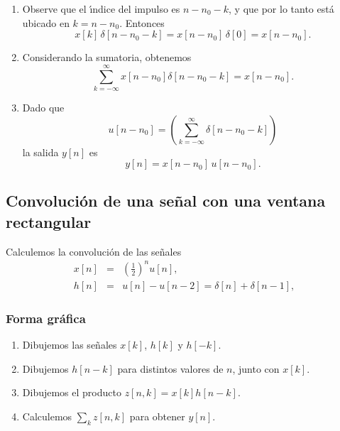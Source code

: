 \begin{enumerate}
\item Observe que el \'{\i}ndice del impulso es $n - n_{0} - k$, y que
  por lo tanto est\'{a} ubicado en $k = n - n_{0}$. Entonces
  \begin{equation}
    x[k] \, \delta \left[ n-n_{0}-k\right] = x[n-n_{0}] \, \delta \left[0\right] = 
    x[n-n_{0}].
  \end{equation}

\item Considerando la sumatoria, obtenemos
  \begin{equation}
    \sum_{k=-\infty}^{\infty }x[n-n_{0}]\delta \left[ n-n_{0}-k\right] = 
    x[n-n_{0}] .
  \end{equation}

\item Dado que
  \begin{equation}
    u[n-n_{0}] = \left( \sum_{k=-\infty}^{\infty } \delta \left[ n-n_{0}-k\right] \right)
  \end{equation}
  la salida $y[n]$ es
  \begin{equation}
    y\left[ n\right] = x[n-n_{0}] \, u[n-n_{0}].
  \end{equation}
\end{enumerate}

\subsection{Convoluci\'{o}n de una se\~{n}al con una ventana
  rectangular}

Calculemos la convoluci\'{o}n de las se\~{n}ales
\begin{eqnarray}
  x\left[ n\right] &=&\left( \frac{1}{2}\right) ^nu\left[ n\right] ,                                      \\
  h\left[ n\right] &=&u\left[ n\right] -u\left[ n-2\right] =
  \delta \left[ n \right] +\delta \left[ n-1\right] ,
\end{eqnarray}

\subsubsection{Forma gr\'{a}fica}

\begin{enumerate}
\item Dibujemos las se\~{n}ales $x[k]$, $h[k]$ y $h[-k]$.
        
\item Dibujemos $h[n-k]$ para distintos valores de $n$, junto con
  $x[k]$.
        
\item Dibujemos el producto $z[n,k] = x[k] h[n-k]$.
        
\item Calculemos $\sum_{k}z[n,k]$ para obtener $y[n]$.
\end{enumerate}


